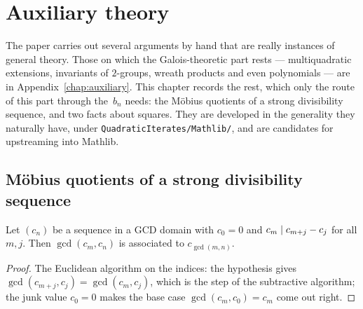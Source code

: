 \chapter{Auxiliary theory}
\label{chap:paper-auxiliary}

The paper carries out several arguments by hand that are really instances of general theory.
Those on which the Galois-theoretic part rests --- multiquadratic extensions, invariants of
$2$-groups, wreath products and even polynomials --- are in Appendix~\ref{chap:auxiliary}. This
chapter records the rest, which only the route of this part through the~$b_n$ needs: the Möbius
quotients of a strong divisibility sequence, and two facts about squares. They are developed in
the generality they naturally have, under \texttt{QuadraticIterates/Mathlib/}, and are candidates
for upstreaming into Mathlib.

\section{Möbius quotients of a strong divisibility sequence}

\begin{lemma}
  \label{lem:strongdvd}
  \leanok
  Let $(c_n)$ be a sequence in a GCD domain with $c_0 = 0$ and $c_m \mathrel{\mid} c_{m+j} - c_j$ for all
  $m, j$. Then $\gcd(c_m, c_n)$ is associated to $c_{\gcd(m,n)}$.
\end{lemma}
\begin{proof}
  \leanok
  The Euclidean algorithm on the indices: the hypothesis gives
  $\gcd(c_{m+j}, c_j) = \gcd(c_m, c_j)$, which is the step of the subtractive algorithm; the
  junk value $c_0 = 0$ makes the base case $\gcd(c_m, c_0) = c_m$ come out right.
\end{proof}

